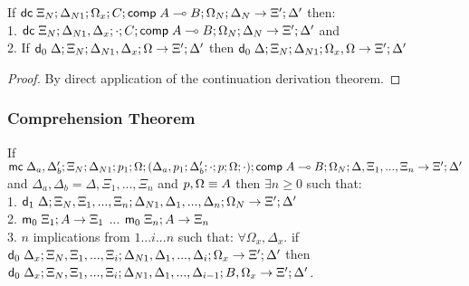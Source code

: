 If $\mathsf{dc} \; \Xi_N; \Delta_{N1}; \Omega_x; C; \mathsf{comp} \; A \multimap B; \Omega_N; \Delta_N \rightarrow \Xi'; \Delta'$ then: \\
1. \hspace{1cm} $\mathsf{dc} \; \Xi_N; \Delta_{N1}, \Delta_x; \cdot; C; \mathsf{comp} \; A \multimap B; \Omega_N; \Delta_N \rightarrow \Xi'; \Delta'$ and \\
2. \hspace{1cm} If $\mathsf{d}_0 \; \Delta; \Xi_N; \Delta_{N1}, \Delta_x; \Omega \rightarrow \Xi'; \Delta'$ then $\mathsf{d}_0 \; \Delta; \Xi_N; \Delta_{N1}; \Omega_x, \Omega \rightarrow \Xi'; \Delta'$

\begin{proof}
   By direct application of the continuation derivation theorem.
\end{proof}

\subsubsection{Comprehension Theorem}

If $\mathsf{mc} \; \Delta_a, \Delta'_b; \Xi_N; \Delta_{N1}; p_1; \Omega; (\Delta_a, p_1; \Delta'_b; \cdot; p; \Omega; \cdot); \mathsf{comp} \; A \multimap B; \Omega_N; \Delta, \Xi_1, ..., \Xi_n \rightarrow \Xi'; \Delta'$ and $\Delta_a, \Delta_b = \Delta, \Xi_1, ..., \Xi_n$ and $p, \Omega \equiv A$ then $\exists n \geq 0$ such that: \\
1. \hspace{1cm} $\mathsf{d}_1 \; \Delta; \Xi_N, \Xi_1, ..., \Xi_n; \Delta_{N1}, \Delta_1, ..., \Delta_n; \Omega_N \rightarrow \Xi'; \Delta'$\\
2. \hspace{1cm} $\mathsf{m}_0 \; \Xi_1; A \rightarrow \Xi_1$ ... $\mathsf{m}_0 \; \Xi_n; A \rightarrow \Xi_n$ \\
3. \hspace{1cm} $n$ implications from $1 ... i ... n$ such that: $\forall \Omega_x, \Delta_x.$ if $\mathsf{d}_0 \; \Delta_x; \Xi_N, \Xi_1, ..., \Xi_i; \Delta_{N1}, \Delta_1, ..., \Delta_i; \Omega_x \rightarrow \Xi'; \Delta'$ then $\mathsf{d}_0 \; \Delta_x; \Xi_N, \Xi_1, ..., \Xi_i; \Delta_{N1}, \Delta_1, ..., \Delta_{i-1}; B, \Omega_x \rightarrow \Xi'; \Delta'$.

